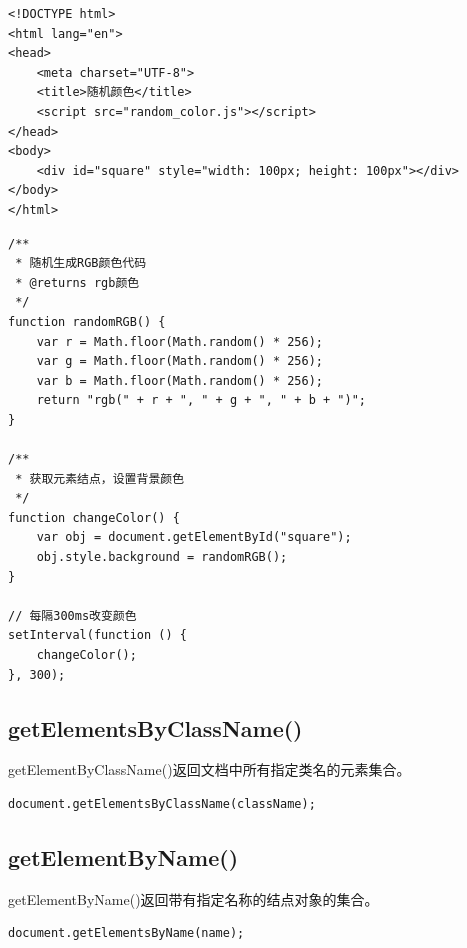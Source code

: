 
\begin{lstlisting}[style=htmlcssjs, title=random\_color.html]
<!DOCTYPE html>
<html lang="en">
<head>
    <meta charset="UTF-8">
    <title>随机颜色</title>
    <script src="random_color.js"></script>
</head>
<body>
    <div id="square" style="width: 100px; height: 100px"></div>
</body>
</html>
\end{lstlisting}

\begin{lstlisting}[style=htmlcssjs, title=random\_color.js]
/**
 * 随机生成RGB颜色代码
 * @returns rgb颜色
 */
function randomRGB() {
    var r = Math.floor(Math.random() * 256);
    var g = Math.floor(Math.random() * 256);
    var b = Math.floor(Math.random() * 256);
    return "rgb(" + r + ", " + g + ", " + b + ")";
}

/**
 * 获取元素结点，设置背景颜色
 */
function changeColor() {
    var obj = document.getElementById("square");
    obj.style.background = randomRGB();
}

// 每隔300ms改变颜色
setInterval(function () {
    changeColor();
}, 300);
\end{lstlisting}

\vspace{0.5cm}

\subsection{getElementsByClassName()}

getElementByClassName()返回文档中所有指定类名的元素集合。\\

\begin{lstlisting}[style=htmlcssjs]
document.getElementsByClassName(className);
\end{lstlisting}

\vspace{0.5cm}

\subsection{getElementByName()}

getElementByName()返回带有指定名称的结点对象的集合。\\

\begin{lstlisting}[style=htmlcssjs]
document.getElementsByName(name);
\end{lstlisting}

